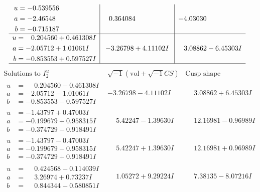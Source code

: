 \documentclass[1p]{elsarticle_modified}
\theoremstyle{definition}
\newcommand{\I}{\sqrt{-1}}
\begin{document}
$$\begin{array}{c|c|c}
\begin{aligned}
u &= -0.539556\phantom{ +0.000000I} \\
a &= -2.46548\phantom{ +0.000000I} \\
b &= -0.715187\phantom{ +0.000000I}\end{aligned}
 & \phantom{-}0.364084\phantom{ +0.000000I} & -4.03030\phantom{ +0.000000I} \\ \hline\begin{aligned}
u &= \phantom{-}0.204560 + 0.461308 I \\
a &= -2.05712 + 1.01061 I \\
b &= -0.853553 + 0.597527 I\end{aligned}
 & -3.26798 + 4.11102 I & \phantom{-}3.08862 - 6.45303 I\\
 \hline 
 \end{array}$$\newpage$$\begin{array}{c|c|c}  
\text{Solutions to }I^u_{2}& \I (\text{vol} + \sqrt{-1}CS) & \text{Cusp shape}\\
 \hline 
\begin{aligned}
u &= \phantom{-}0.204560 - 0.461308 I \\
a &= -2.05712 - 1.01061 I \\
b &= -0.853553 - 0.597527 I\end{aligned}
 & -3.26798 - 4.11102 I & \phantom{-}3.08862 + 6.45303 I \\ \hline\begin{aligned}
u &= -1.43797 + 0.47003 I \\
a &= -0.199679 + 0.958315 I \\
b &= -0.374729 - 0.918491 I\end{aligned}
 & \phantom{-}5.42247 - 1.39630 I & \phantom{-}12.16981 - 0.96989 I \\ \hline\begin{aligned}
u &= -1.43797 - 0.47003 I \\
a &= -0.199679 - 0.958315 I \\
b &= -0.374729 + 0.918491 I\end{aligned}
 & \phantom{-}5.42247 + 1.39630 I & \phantom{-}12.16981 + 0.96989 I \\ \hline\begin{aligned}
u &= \phantom{-}0.424568 + 0.114039 I \\
a &= \phantom{-}3.26974 + 0.73237 I \\
b &= \phantom{-}0.844344 - 0.580851 I\end{aligned}
 & \phantom{-}1.05272 + 9.29224 I & \phantom{-}7.38135 - 8.07216 I \\ \hline\begin{aligned}

\end{aligned}
\end{array}$$
\end{document}
